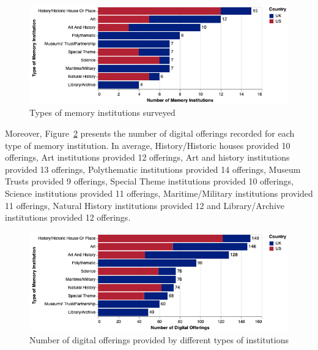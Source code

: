 \documentclass{egpubl}
\begin{document}
\begin{figure}[h]
  \centering
  \includegraphics[width=\linewidth]{images/museumtype.png}
  \caption{\label{fig:MType}
           Types of memory institutions surveyed}
\end{figure}

Moreover, Figure~\ref{fig:typeofferings} presents the number of digital offerings recorded for each type of memory institution. In average, History/Historic houses provided 10 offerings, Art institutions provided 12 offerings, Art and history institutions provided 13 offerings, Polythematic institutions provided 14 offerings, Museum Trusts provided 9 offerings, Special Theme institutions provided 10 offerings, Science institutions provided 11 offerings, Maritime/Military institutions provided 11 offerings, Natural History institutions provided 12 and Library/Archive institutions provided 12 offerings. 

\begin{figure}[h]
  \centering
  \includegraphics[width=\linewidth]{images/typesoffering.png}
  \caption{\label{fig:typeofferings}
           Number of digital offerings provided by different types of institutions}
\end{figure}
\end{document}
